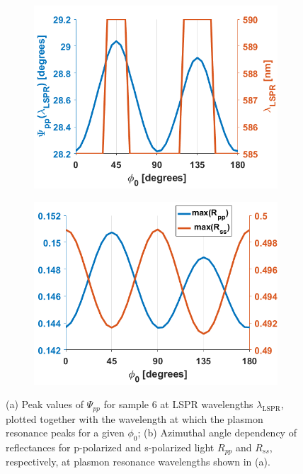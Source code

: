 \begin{figure}[h!]
    \begin{subfigure}{0.5\textwidth}
        \centering
        \includegraphics[width=0.8\linewidth, trim=0cm  0cm 0cm 0cm, clip]{figures/ch4/S6/S6_Psi_pp@LSPR.png}
        \caption{}
        \label{fig:S6_LSPRvsphi_Psipp}
    \end{subfigure}
    \begin{subfigure}{0.5\textwidth}
        \centering
        \includegraphics[width=0.8\linewidth, trim=0cm  0cm 0cm 0cm, clip]{figures/ch4/S6/S6_Rpp_Rss@LSPR.png}
        \caption{}
        \label{fig:S6_LSPRvsphi_RppRss}
    \end{subfigure}
    \caption{(a) Peak values of $\Psi_{pp}$ for sample 6 at LSPR wavelengths $\lambda_{\text{LSPR}}$, plotted together with the wavelength at which the plasmon resonance peaks for a given $\phi_0$; (b) Azimuthal angle dependency of reflectances for p-polarized and s-polarized light $R_{pp}$ and $R_{ss}$, respectively, at plasmon resonance wavelengths shown in (a).}
    \label{fig:S6_LSPRvsphi}
\end{figure}

